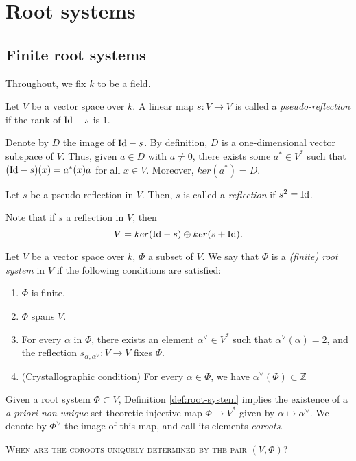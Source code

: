 \chapter{Root systems}
\label{cha:root-systems}
\section{Finite root systems}
\label{sec:finite-root-systems}

Throughout, we fix $k$ to be a field. 

\begin{definition}
    Let $V$ be a vector space over $k$. A linear map $s : V \to V$ is called a {\it pseudo-reflection} if 
    the rank of ${\rm Id}-s$ is $1$. 
\end{definition}
Denote by $D$ the image of ${\rm Id}-s$. By definition, $D$ is a one-dimensional vector subspace of $V$. 
Thus, given $a \in D$ with $a \neq 0$, there exists some $a^* \in V^*$ such that $({\rm Id}-s)(x)= a^*(x) a$ for 
all $x \in V$. Moreover, $ker(a^*) = D$.

\begin{definition}
    Let $s$ be a pseudo-reflection in $V$. Then, $s$ is called a {\it reflection} if $s^2 = {\rm Id}$.
\end{definition}

Note that if $s$ a reflection in $V$, then 
    \[
        V = ker({\rm Id}-s) \oplus ker(s+{\rm Id}).
    \]

\begin{definition}
  \label{def:root-system}
  Let $V$ be a vector space over $k$, $\Phi$ a subset of $V$. We say that $\Phi$ is a 
  \emph{(finite) root system} in $V$ if the following conditions are satisfied:
    \begin{enumerate}
        \item $\Phi$ is finite,
        \item $\Phi$ spans $V$.
        \item For every $\alpha$ in $\Phi$, there exists an element $\alpha^\vee \in V^*$ such that 
            $\alpha^\vee(\alpha) = 2$, and the reflection $s_{\alpha,\alpha^\vee}: V \to V$ fixes $\Phi$.
        \item (Crystallographic condition) For every $\alpha\in \Phi$, we have $\alpha^\vee(\Phi) \subset \mathbb{Z}$
    \end{enumerate}
\end{definition}
Given a root system $\Phi \subset V$, Definition \ref{def:root-system} implies the existence of a 
{\it a priori non-unique} set-theoretic injective map $\Phi \to V^*$ given by $\alpha \mapsto \alpha^\vee$. 
We denote by $\Phi^\vee$ the image of this map, and call its elements {\it coroots}. 

\textsc{When are the coroots uniquely determined by the pair $(V,\Phi)$?}




